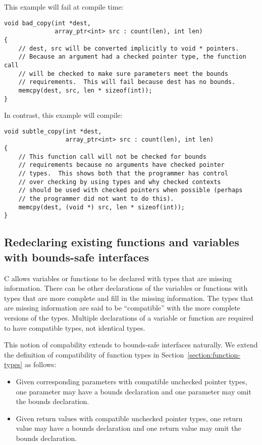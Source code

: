 This example will fail at compile time:
\begin{verbatim}
void bad_copy(int *dest,
              array_ptr<int> src : count(len), int len)
{
    // dest, src will be converted implicitly to void * pointers.
    // Because an argument had a checked pointer type, the function call
    // will be checked to make sure parameters meet the bounds
    // requirements.  This will fail because dest has no bounds.
    memcpy(dest, src, len * sizeof(int));
}
\end{verbatim}

In contrast, this example will compile:
\begin{verbatim}
void subtle_copy(int *dest,
                 array_ptr<int> src : count(len), int len)
{
    // This function call will not be checked for bounds
    // requirements because no arguments have checked pointer
    // types.  This shows both that the programmer has control
    // over checking by using types and why checked contexts
    // should be used with checked pointers when possible (perhaps
    // the programmer did not want to do this).
    memcpy(dest, (void *) src, len * sizeof(int));
}
\end{verbatim}

\subsection{Redeclaring existing functions and variables with bounds-safe interfaces}
\label{section:bounds-safe-interface-redeclaration}

C allows variables or functions to be declared with types that are missing information.
There can be other declarations of the variables or functions with types that are more complete
and fill in the missing information.  The types that are missing information are said to be
``compatible'' with the more complete versions of the types.  Multiple declarations of
a variable or function are required to have compatible types, not identical types.

This notion of compability extends to bounds-safe interfaces naturally.  We extend the
definition of compatibility of function types in Section~\ref{section:function-types} as follows:
\begin{itemize}
\item Given corresponding parameters with compatible unchecked pointer types,
one parameter may have a bounds declaration and one parameter may omit the bounds declaration.
\item Given return values with compatible unchecked pointer types, one
return value may have a bounds declaration and one return value may omit the bounds declaration.
\end{itemize}

